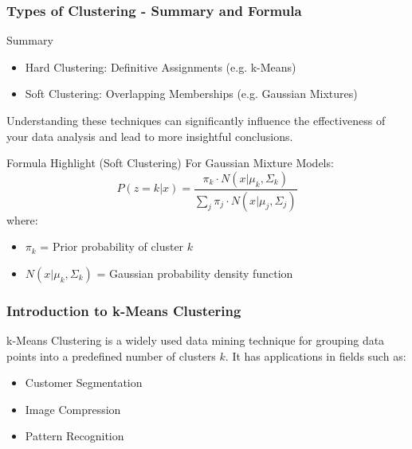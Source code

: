 \documentclass[aspectratio=169]{beamer}
\begin{document}
\begin{frame}[fragile]
    \frametitle{Types of Clustering - Summary and Formula}
    \begin{block}{Summary}
        \begin{itemize}
            \item Hard Clustering: Definitive Assignments (e.g. k-Means)
            \item Soft Clustering: Overlapping Memberships (e.g. Gaussian Mixtures)
        \end{itemize}
        Understanding these techniques can significantly influence the effectiveness of your data analysis and lead to more insightful conclusions.
    \end{block}

    \begin{block}{Formula Highlight (Soft Clustering)}
        For Gaussian Mixture Models:
        \begin{equation}
        P(z=k | x) = \frac{\pi_k \cdot N(x | \mu_k, \Sigma_k)}{\sum_j \pi_j \cdot N(x | \mu_j, \Sigma_j)}
        \end{equation}
        where:
        \begin{itemize}
            \item \( \pi_k \) = Prior probability of cluster \( k \)
            \item \( N(x | \mu_k, \Sigma_k) \) = Gaussian probability density function
        \end{itemize}
    \end{block}
\end{frame}

\begin{frame}[fragile]
    \frametitle{Introduction to k-Means Clustering}
    k-Means Clustering is a widely used data mining technique for grouping data points into a predefined number of clusters \( k \). It has applications in fields such as:
    \begin{itemize}
        \item Customer Segmentation
        \item Image Compression
        \item Pattern Recognition
    \end{itemize}
\end{frame}
\end{document}
